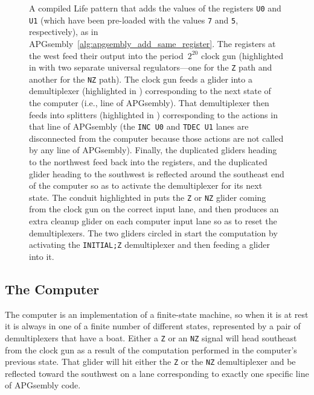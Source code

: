 \begin{figure}[!htb]
	\centering
	\caption{A compiled Life pattern that adds the values of the registers \texttt{U0} and \texttt{U1} (which have been pre-loaded with the values \texttt{7} and \texttt{5}, respectively), as in APGsembly~\ref{alg:apgsembly_add_same_register}. The registers at the west feed their output into the period~$2^{20}$ clock gun (highlighted in  with two separate universal regulators---one for the \texttt{Z} path and another for the \texttt{NZ} path). The clock gun feeds a glider into a demultiplexer (highlighted in ) corresponding to the next state of the computer (i.e., line of APGsembly). That demultiplexer then feeds into splitters (highlighted in ) corresponding to the actions in that line of APGsembly (the \texttt{INC U0} and \texttt{TDEC U1} lanes are disconnected from the computer because those actions are not called by any line of APGsembly). Finally, the duplicated gliders heading to the northwest feed back into the registers, and the duplicated glider heading to the southwest is reflected around the southeast end of the computer so as to activate the demultiplexer for its next state. The conduit highlighted in  puts the \texttt{Z} or \texttt{NZ} glider coming from the clock gun on the correct input lane, and then produces an extra cleanup glider on each computer input lane so as to reset the demultiplexers. The two gliders circled in  start the computation by activating the \texttt{INITIAL;Z} demultiplexer and then feeding a glider into it.}\label{fig:add_computer}
\end{figure}


\subsection{The Computer}

The computer is an implementation of a finite-state machine, so when it is at rest it is always in one of a finite number of different states, represented by a pair of demultiplexers that have a boat. Either a \texttt{Z} or an \texttt{NZ} signal will head southeast from the clock gun as a result of the computation performed in the computer's previous state. That glider will hit either the \texttt{Z} or the \texttt{NZ} demultiplexer and be reflected toward the southwest on a lane corresponding to exactly one specific line of APGsembly code.

